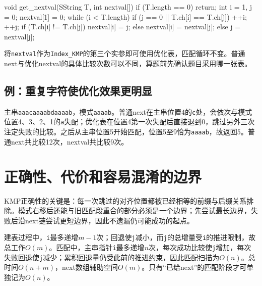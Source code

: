 \par\medskip\noindent\begin{minipage}{\linewidth}
\begin{codeblock}[language=C++]
void get_nextval(SString T, int nextval[]) {
    if (T.length == 0) return;
    int i = 1, j = 0;
    nextval[1] = 0;
    while (i < T.length) {
        if (j == 0 || T.ch[i] == T.ch[j]) {
            ++i; ++j;
            if (T.ch[i] != T.ch[j])
                nextval[i] = j;
            else
                nextval[i] = nextval[j];
        } else {
            j = nextval[j];
        }
    }
}
\end{codeblock}
\end{minipage}\par\medskip

将\texttt{nextval}作为\texttt{Index\_KMP}的第三个实参即可使用优化表，匹配循环不变。普通next与优化nextval的具体比较次数可以不同，算题前先确认题目采用哪一张表。

\subsection{例：重复字符使优化效果更明显}\label{DS04-opt-example}

主串\texttt{aaacaaaabdaaaab}，模式\texttt{aaaab}。普通next在主串位置4的\texttt{c}处，会依次与模式位置4、3、2、1的\texttt{a}失配；优化表在位置4第一次失配后直接退到0，跳过另外三次注定失败的比较。之后从主串位置5开始匹配，位置5至9恰为\texttt{aaaab}，故返回5。普通next共比较12次，nextval共比较9次。

\section{正确性、代价和容易混淆的边界}\label{DS04-analysis}

KMP正确性的关键是：每一次跳过的对齐位置都被已经相等的前缀与后缀关系排除。模式右移后还能与旧匹配段重合的部分必须是一个边界；先尝试最长边界，失败后沿next链尝试更短边界，因此不遗漏仍可能成功的起点。

建表过程中，\texttt{i}最多递增\(m-1\)次；回退使\texttt{j}减小，而\texttt{j}的总增量受\texttt{i}的推进限制，故总工作\(O(m)\)。匹配中，主串指针\texttt{i}最多递增\(n\)次，每次成功比较使\texttt{j}增加，每次失败回退使\texttt{j}减少；累积回退量仍受此前的推进约束，因此匹配扫描为\(O(n)\)。总时间\(O(n+m)\)，next数组辅助空间\(O(m)\)。只有``已给next''的匹配阶段才可单独记为\(O(n)\)。

